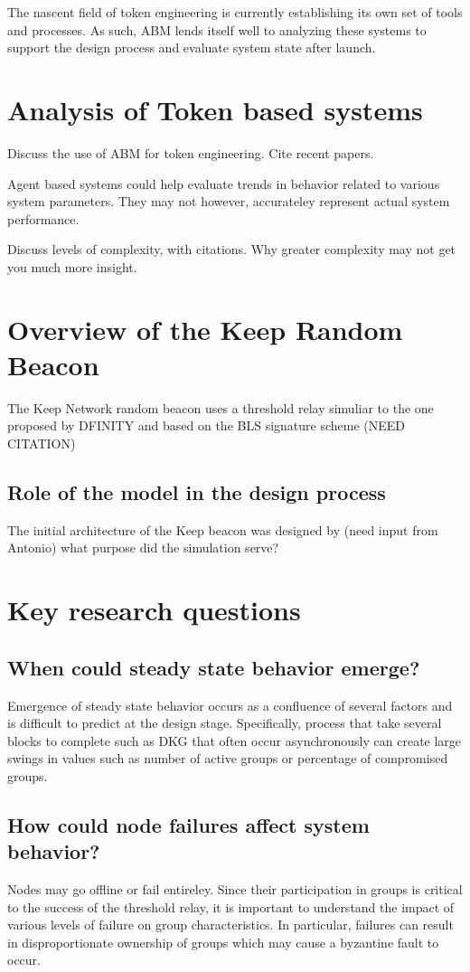 \documentclass[conference]{IEEEtran}
\begin{document}
The nascent field of token engineering is currently establishing its own set 
of tools and processes. As such, ABM lends itself well to analyzing these systems
to support the design process and evaluate system state after launch.

\section{Analysis of Token based systems}


Discuss the use of ABM for token engineering. Cite recent papers.

Agent based systems could help evaluate trends in behavior related to
various system parameters. They may not however, accurateley represent 
actual system performance. 

Discuss levels of complexity, with citations. Why greater complexity may
not get you much more insight.

\section{Overview of the Keep Random Beacon}
The Keep Network random beacon uses a threshold relay simuliar to the one proposed
by DFINITY and based on the BLS signature scheme \cite{} (NEED CITATION)

\subsection{Role of the model in the design process}
The initial architecture of the Keep beacon was designed by (need input from Antonio)
what purpose did the simulation serve?

\section{Key research questions}
\subsection{When could steady state behavior emerge?}
Emergence of steady state behavior occurs as a confluence of several factors and is difficult
to predict at the design stage. Specifically, process that take several blocks to complete 
such as DKG that often occur asynchronously can create large swings in values such as number of active
groups or percentage of compromised groups. 

\subsection{How could node failures affect system behavior?}
Nodes may go offline or fail entireley. Since their participation in groups is critical to the 
success of the threshold relay, it is important to understand the impact of various levels
of failure on group characteristics. In particular, failures can result in disproportionate ownership
of groups which may cause a byzantine fault to occur. 
\end{document}
